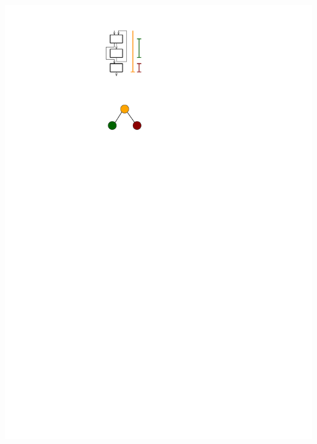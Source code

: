 \documentclass[navbaroff,en]{sdqbeamer}
\begin{document}
\begin{frame}
\begin{columns}
		\begin{column}{0.35\textwidth}
			\vspace{40pt}
			\vfill
			\centering \includegraphics[scale=0.7]{images/techniques.pdf}
		\end{column}
	\end{columns}

\end{frame}
\end{document}
